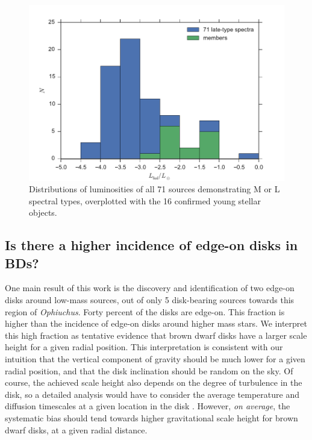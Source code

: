 \begin{figure}[ht!]
  \caption[Luminosity distibution of this sample and background contaminants]{Distributions of luminosities of all 71 sources demonstrating M or L spectral types, overplotted with the 16 confirmed young stellar objects. \label{fig_luminosity_dist} }
\centering
\includegraphics[scale=0.6]{chIMACS/figures/luminosity_histogram}
\end{figure}


\subsection{Is there a higher incidence of edge-on disks in BDs?}
One main result of this work is the discovery and identification of two edge-on disks around low-mass sources, out of only 5 disk-bearing sources towards this region of \emph{Ophiuchus}.  Forty percent of the disks are edge-on.  This fraction is higher than the incidence of edge-on disks around higher mass stars.  We interpret this high fraction as tentative evidence that brown dwarf disks have a larger scale height for a given radial position.  This interpretation is consistent with our intuition that the vertical component of gravity should be much lower for a given radial position, and that the disk inclination should be random on the sky.  Of course, the achieved scale height also depends on the degree of turbulence in the disk, so a detailed analysis would have to consider the average temperature and diffusion timescales at a given location in the disk \citep{2012A&A...539A...9M,2009MNRAS.394L.141E}.  However, \emph{on average}, the systematic bias should tend towards higher gravitational scale height for brown dwarf disks, at a given radial distance.

